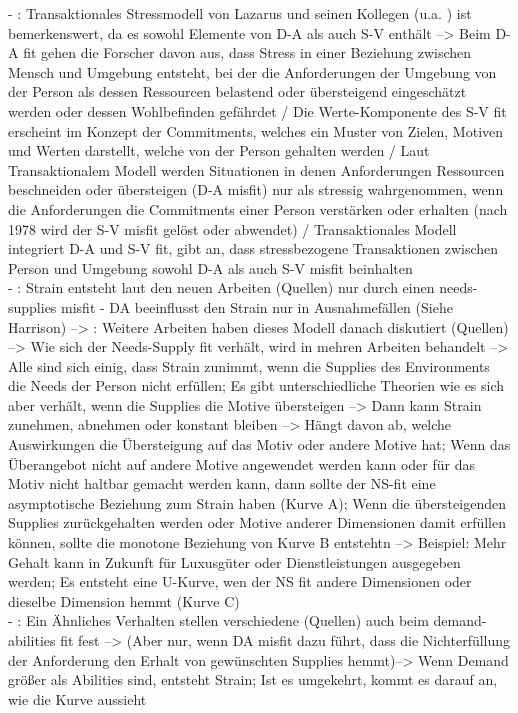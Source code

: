 \newpage
- \cite[S. 3]{edwards:1990}: Transaktionales Stressmodell von Lazarus und seinen Kollegen (u.a. \textcite{lazarus:1978}) ist bemerkenswert, da es sowohl Elemente von D-A als auch S-V enthält --> Beim D-A fit gehen die Forscher davon aus, dass Stress in einer Beziehung zwischen Mensch und Umgebung entsteht, bei der die Anforderungen der Umgebung von der Person als dessen Ressourcen belastend oder übersteigend eingeschätzt werden oder dessen Wohlbefinden gefährdet / Die Werte-Komponente des S-V fit erscheint im Konzept der Commitments, welches ein Muster von Zielen, Motiven und Werten darstellt, welche von der Person gehalten werden / Laut Transaktionalem Modell werden Situationen in denen Anforderungen Ressourcen beschneiden oder übersteigen (D-A misfit) nur als stressig wahrgenommen, wenn die Anforderungen die Commitments einer Person verstärken oder erhalten (nach \textcite{harrison:1978} 1978 wird der S-V misfit gelöst oder abwendet) / Transaktionales Modell integriert D-A und S-V fit, gibt an, dass stressbezogene Transaktionen zwischen Person und Umgebung sowohl D-A als auch S-V misfit beinhalten \\
- \cite[S. 20]{edwards:2008}: Strain entsteht laut den neuen Arbeiten (Quellen) nur durch einen needs-supplies misfit - DA beeinflusst den Strain nur in Ausnahmefällen (Siehe Harrison) --> \cite[S. 21]{edwards:2008}: Weitere Arbeiten haben dieses Modell danach diskutiert (Quellen) --> Wie sich der Needs-Supply fit verhält, wird in mehren Arbeiten behandelt --> Alle sind sich einig, dass Strain zunimmt, wenn die Supplies des Environments die Needs der Person nicht erfüllen; Es gibt unterschiedliche Theorien wie es sich aber verhält, wenn die Supplies die Motive übersteigen --> Dann kann Strain zunehmen, abnehmen oder konstant bleiben --> Hängt davon ab, welche Auswirkungen die Übersteigung auf das Motiv oder andere Motive hat; Wenn das Überangebot nicht auf andere Motive angewendet werden kann oder für das Motiv nicht haltbar gemacht werden kann, dann sollte der NS-fit eine asymptotische Beziehung zum Strain haben (Kurve A); Wenn die übersteigenden Supplies zurückgehalten werden oder Motive anderer Dimensionen damit erfüllen können, sollte die monotone Beziehung von Kurve B entstehtn --> Beispiel: Mehr Gehalt kann in Zukunft für Luxusgüter oder Dienstleistungen ausgegeben werden; Es entsteht eine U-Kurve, wen der NS fit andere Dimensionen oder dieselbe Dimension hemmt (Kurve C) \\
- \cite[S. 22f.]{edwards:2008}: Ein Ähnliches Verhalten stellen verschiedene (Quellen) auch beim demand-abilities fit fest --> (Aber nur, wenn DA misfit dazu führt, dass die Nichterfüllung der Anforderung den Erhalt von gewünschten Supplies hemmt)--> Wenn Demand größer als Abilities sind, entsteht Strain; Ist es umgekehrt, kommt es darauf an, wie die Kurve aussieht \\


